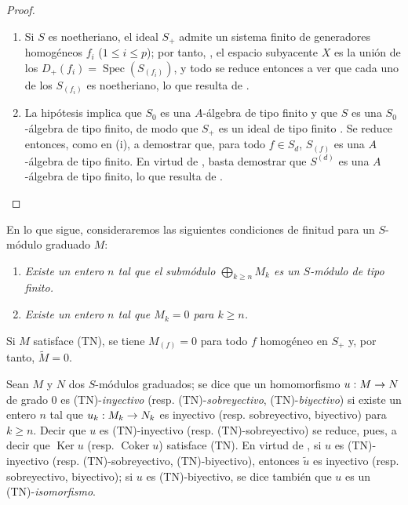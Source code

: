 \documentclass[oneside,10pt]{amsart}
\makeatletter
\renewcommand{\leq}{\leqslant}
\renewcommand{\geq}{\geqslant}
\newcommand{\ega@arrow}[2]{\mathchoice{#1}{#2}{#2}{#2}}
\renewcommand{\to}{\ega@arrow{\longrightarrow}{\rightarrow}}
\newcommand{\oldpage}[2][]{\marginnote{\normalfont\footnotesize\textbf{#1}~|~#2}\ignorespaces}
\let\EGAOriginalLabel\label
\renewcommand{\label}[1]{\phantomsection\EGAOriginalLabel{#1}}
\makeatother
\begin{document}
\oldpage[II]{39}
\begin{proof}
\medskip\noindent
\begin{enumerate}
  \item[{\rm(i)}] Si $S$ es noetheriano, el ideal $S_+$ admite un sistema finito de generadores homogéneos $f_i$ ($1\leq i\leq p$); por tanto, , el espacio subyacente $X$ es la unión de los $D_+(f_i)=\operatorname{Spec}(S_{(f_i)})$, y todo se reduce entonces a ver que cada uno de los $S_{(f_i)}$ es noetheriano, lo que resulta de .
  \item[{\rm(ii)}] La hipótesis implica que $S_0$ es una $A$-álgebra de tipo finito y que $S$ es una $S_0$-álgebra de tipo finito, de modo que $S_+$ es un ideal de tipo finito .
    Se reduce entonces, como en (i), a demostrar que, para todo $f\in S_d$, $S_{(f)}$ es una $A$-álgebra de tipo finito.
    En virtud de , basta demostrar que $S^{(d)}$ es una $A$-álgebra de tipo finito, lo que resulta de .
\end{enumerate}
\end{proof}

\begin{env}[2.7.2]
\label{II.2.7.2-fr}
En lo que sigue, consideraremos las siguientes condiciones de finitud para un $S$-módulo graduado $M$:
\begin{enumerate}
  \item[{\rm(TF)}] \emph{Existe un entero $n$ tal que el submódulo $\bigoplus_{k\geq n}M_k$ es un $S$-módulo de tipo finito.}
  \item[{\rm(TN)}] \emph{Existe un entero $n$ tal que $M_k=0$ para $k\geq n$.}
\end{enumerate}

Si $M$ satisface (TN), se tiene $M_{(f)}=0$ para todo $f$ homogéneo en $S_+$ y, por tanto, $\widetilde{M}=0$.

Sean $M$ y $N$ dos $S$-módulos graduados; se dice que un homomorfismo $u:M\to N$ de grado $0$ es (TN)-\emph{inyectivo} (resp. (TN)-\emph{sobreyectivo}, (TN)-\emph{biyectivo}) si existe un entero $n$ tal que $u_k:M_k\to N_k$ es inyectivo (resp. sobreyectivo, biyectivo) para $k\geq n$.
Decir que $u$ es (TN)-inyectivo (resp. (TN)-sobreyectivo) se reduce, pues, a decir que $\operatorname{Ker}u$ (resp. $\operatorname{Coker}u$) satisface (TN).
En virtud de , si $u$ es (TN)-inyectivo (resp. (TN)-sobreyectivo, (TN)-biyectivo), entonces $\widetilde{u}$ es inyectivo (resp. sobreyectivo, biyectivo); si $u$ es (TN)-biyectivo, se dice también que $u$ es un (TN)-\emph{isomorfismo}.
\end{env}
\end{document}
